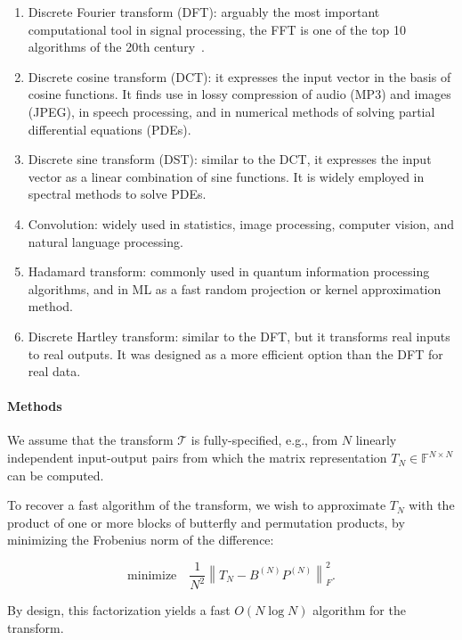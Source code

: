 \begin{enumerate}[topsep=1pt, itemsep=-1ex, partopsep=1ex, parsep=1ex]
  \item Discrete Fourier transform (DFT): arguably the most important computational tool in signal processing, the FFT is one of the top 10 algorithms of the 20th century~\citep{dongarra2000guest}.
  \item Discrete cosine transform (DCT): it expresses the input vector in the basis of cosine functions. It finds use in lossy compression of audio (MP3) and images (JPEG), in speech processing, and in numerical methods of solving partial differential equations (PDEs).
  \item Discrete sine transform (DST): similar to the DCT, it expresses the input vector as a linear combination of sine functions. It is widely employed in spectral methods to solve PDEs.
  \item Convolution: widely used in statistics, image processing, computer vision, and natural language processing.
  \item Hadamard transform: commonly used in quantum information processing algorithms, and in ML as a fast random projection or kernel approximation method.
  \item Discrete Hartley transform: similar to the DFT, but it transforms real inputs to real outputs. It was designed as a more efficient option than the DFT for real data.
\end{enumerate}

\paragraph{Methods}
We assume that the transform $\mathcal{T}$ is fully-specified, e.g., from $N$ linearly independent input-output pairs from which the matrix representation $T_N \in \mathbb{F}^{N \times N}$ can be computed.

To recover a fast algorithm of the transform, we wish to approximate $T_N$ with the product of one or more blocks of butterfly and permutation products, by minimizing the Frobenius norm of the difference:

\begin{equation}
  \mbox{minimize} \quad \frac{1}{N^2} \left\| T_N - B^{(N)} P^{(N)} \right\|^2_F.
  \label{eq:frob_objective}
\end{equation}

By design, this factorization yields a fast $O(N \log N)$ algorithm for the transform.

